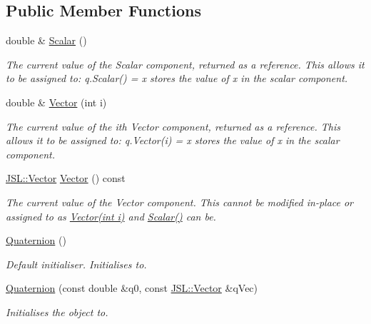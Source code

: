 \subsection*{Public Member Functions}
\begin{DoxyCompactItemize}
\item 
double \& \hyperlink{classQDynamics_1_1Quaternion_a8121c47a579baffb9e692b8cd2c7dee7}{Scalar} ()
\begin{DoxyCompactList}\small\item\em The current value of the Scalar component, returned as a {\itshape reference}. This allows it to be assigned to\+: q.\+Scalar() = x stores the value of x in the scalar component. \end{DoxyCompactList}\item 
double \& \hyperlink{classQDynamics_1_1Quaternion_ad2f24d575d2fb8a50a9d4fd397115b9e}{Vector} (int i)
\begin{DoxyCompactList}\small\item\em The current value of the ith Vector component, returned as a {\itshape reference}. This allows it to be assigned to\+: q.\+Vector(i) = x stores the value of x in the scalar component. \end{DoxyCompactList}\item 
\hyperlink{classJSL_1_1Vector}{J\+S\+L\+::\+Vector} \hyperlink{classQDynamics_1_1Quaternion_ac35047116c055b5baeec49b8ebba0ede}{Vector} () const
\begin{DoxyCompactList}\small\item\em The current value of the Vector component. This cannot be modified in-\/place or assigned to as \hyperlink{classQDynamics_1_1Quaternion_ad2f24d575d2fb8a50a9d4fd397115b9e}{Vector(int i)} and \hyperlink{classQDynamics_1_1Quaternion_a8121c47a579baffb9e692b8cd2c7dee7}{Scalar()} can be. \end{DoxyCompactList}\item 
\hyperlink{classQDynamics_1_1Quaternion_addca2bd1d2288c6875eab9f7b4c60881}{Quaternion} ()
\begin{DoxyCompactList}\small\item\em Default initialiser. Initialises to. \end{DoxyCompactList}\item 
\hyperlink{classQDynamics_1_1Quaternion_a206147a6dbe4a9456cd655d654ef0182}{Quaternion} (const double \&q0, const \hyperlink{classJSL_1_1Vector}{J\+S\+L\+::\+Vector} \&q\+Vec)
\begin{DoxyCompactList}\small\item\em Initialises the object to. \end{DoxyCompactList}\item 

\end{DoxyCompactItemize}
